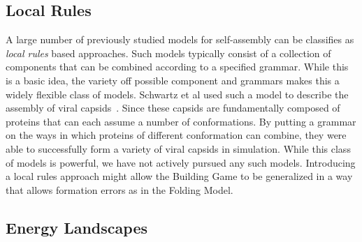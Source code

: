 


\subsection{Local Rules}

A large number of previously studied models for self-assembly can be classifies as \textit{local rules} based approaches. Such models typically consist of a collection of components that can be combined according to a specified grammar. While this is a basic idea, the variety off possible component and grammars makes this a widely flexible class of models. Schwartz et al used such a model to describe the assembly of viral capsids~\cite{Berger1994, Schwartz1998}. Since these capsids are fundamentally composed of proteins that can each assume a number of conformations. By putting a grammar on the ways in which proteins of different conformation can combine, they were able to successfully form a variety of viral capsids in simulation. While this class of models is powerful, we have not actively pursued any such models. Introducing a local rules approach might allow the Building Game to be generalized in a way that allows formation errors as in the Folding Model.    


\subsection{Energy Landscapes}


